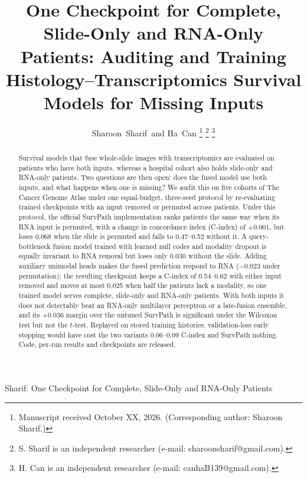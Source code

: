 \documentclass[journal]{IEEEtran}
\newcommand{\cindex}{C-index}
\begin{document}
\title{One Checkpoint for Complete, Slide-Only and RNA-Only Patients: Auditing and Training Histology--Transcriptomics Survival Models for Missing Inputs}

\author{Sharoon~Sharif\, and Ha~Can%
\thanks{Manuscript received October XX, 2026. (Corresponding author: Sharoon Sharif.)}%
\thanks{S. Sharif is an independent researcher (e-mail: sharoonsharif@gmail.com).}%
\thanks{H. Can is an independent researcher (e-mail: canhaB139@gmail.com).}}

%
{Sharif: One Checkpoint for Complete, Slide-Only and RNA-Only Patients}

\maketitle
{}

\begin{abstract}
Survival models that fuse whole-slide images with transcriptomics are evaluated on patients who have both inputs, whereas a hospital cohort also holds slide-only and RNA-only patients. Two questions are then open: does the fused model use both inputs, and what happens when one is missing? We audit this on five cohorts of The Cancer Genome Atlas under one equal-budget, three-seed protocol by re-evaluating trained checkpoints with an input removed or permuted across patients. Under this protocol, the official SurvPath implementation ranks patients the same way when its RNA input is permuted, with a change in concordance index (\cindex{}) of $+0.001$, but loses 0.068 when the slide is permuted and falls to 0.47--0.52 without it. A query-bottleneck fusion model trained with learned null codes and modality dropout is equally invariant to RNA removal but loses only 0.030 without the slide. Adding auxiliary unimodal heads makes the fused prediction respond to RNA ($-0.023$ under permutation); the resulting checkpoint keeps a \cindex{} of 0.54--0.62 with either input removed and moves at most 0.025 when half the patients lack a modality, so one trained model serves complete, slide-only and RNA-only patients. With both inputs it does not detectably beat an RNA-only multilayer perceptron or a late-fusion ensemble, and its $+0.036$ margin over the untuned SurvPath is significant under the Wilcoxon test but not the $t$-test. Replayed on stored training histories, validation-loss early stopping would have cost the two variants 0.06--0.09 \cindex{} and SurvPath nothing. Code, per-run results and checkpoints are released.
\end{abstract}
\end{document}
